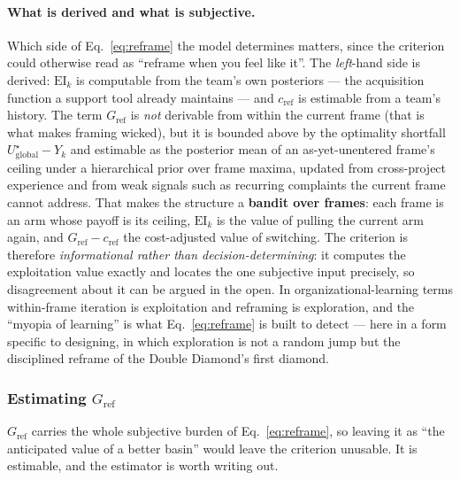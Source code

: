 \documentclass[11pt]{article}
\begin{document}
\paragraph{What is derived and what is subjective.} Which side of Eq.~\eqref{eq:reframe} the model determines matters, since the criterion could otherwise read as ``reframe when you feel like it''. The \emph{left}-hand side is derived: $\mathrm{EI}_k$ is computable from the team's own posteriors --- the acquisition function a support tool already maintains --- and $c_{\text{ref}}$ is estimable from a team's history. The term $G_{\text{ref}}$ is \emph{not} derivable from within the current frame (that is what makes framing wicked), but it is bounded above by the optimality shortfall $U^{\star}_{\text{global}}-Y_k$ and estimable as the posterior mean of an as-yet-unentered frame's ceiling under a hierarchical prior over frame maxima, updated from cross-project experience and from weak signals such as recurring complaints the current frame cannot address. That makes the structure a \textbf{bandit over frames}: each frame is an arm whose payoff is its ceiling, $\mathrm{EI}_k$ is the value of pulling the current arm again, and $G_{\text{ref}}-c_{\text{ref}}$ the cost-adjusted value of switching. The criterion is therefore \emph{informational rather than decision-determining}: it computes the exploitation value exactly and locates the one subjective input precisely, so disagreement about it can be argued in the open. In organizational-learning terms \citep{march1991} within-frame iteration is exploitation and reframing is exploration, and the ``myopia of learning'' \citep{levinthal1993, levinthal1997} is what Eq.~\eqref{eq:reframe} is built to detect --- here in a form specific to designing, in which exploration is not a random jump but the disciplined reframe of the Double Diamond's first diamond.

\subsubsection*{Estimating $G_{\text{ref}}$}
\label{sec:gref}

$G_{\text{ref}}$ carries the whole subjective burden of Eq.~\eqref{eq:reframe}, so leaving it as ``the anticipated value of a better basin'' would leave the criterion unusable. It is estimable, and the estimator is worth writing out.
\end{document}

